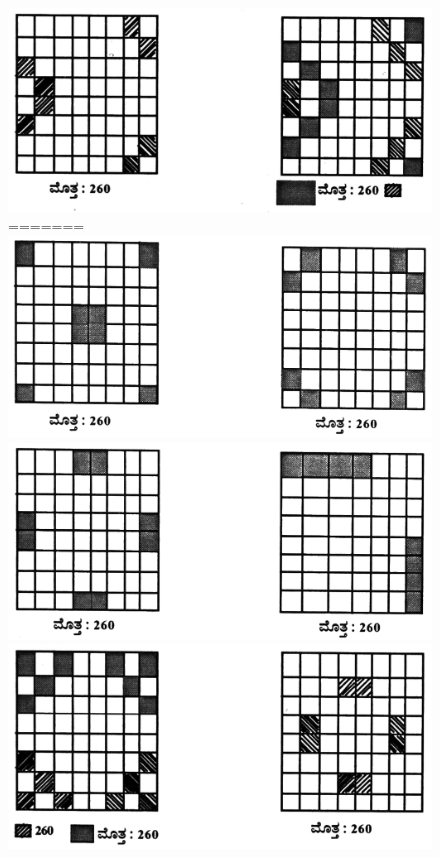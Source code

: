\begin{figure}[H]
\includegraphics{src/figures/chap7/fig7-6.jpg}
=======
\includegraphics[scale=0.85]{src/figures/chap7/fig7.3.jpg}\\
\includegraphics[scale=0.85]{src/figures/chap7/fig7.4.jpg}\\
\includegraphics[scale=0.85]{src/figures/chap7/fig7.5.jpg}\\

\end{figure}
